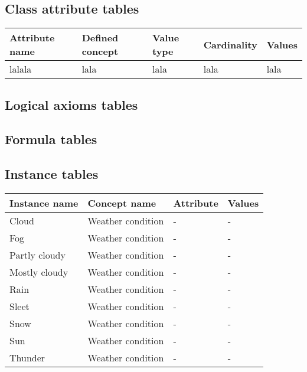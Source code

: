\subsection{Class attribute tables}

\begin{longtable}{|p{}|p{}|p{}|p{}|p{}|}
  \hline
  \textbf{Attribute name} & \textbf{Defined concept} & \textbf{Value type} & \textbf{Cardinality} & \textbf{Values} \\
  \hline\hline
  lalala & lala & lala & lala & lala \\
  \hline
\end{longtable}

\subsection{Logical axioms tables}


\subsection{Formula tables}


\subsection{Instance tables}

\begin{longtable}{|p{}|p{}|p{}|p{}|}
  \hline
  \textbf{Instance name} & \textbf{Concept name} & \textbf{Attribute} & \textbf{Values} \\
  \hline\hline
  Cloud & Weather condition & - & - \\
  \hline
  Fog & Weather condition & - & - \\
  \hline
  Partly cloudy & Weather condition & - & - \\
  \hline
  Mostly cloudy & Weather condition & - & - \\
  \hline
  Rain & Weather condition & - & - \\
  \hline
  Sleet & Weather condition & - & - \\
  \hline
  Snow & Weather condition & - & - \\
  \hline
  Sun & Weather condition & - & - \\
  \hline
  Thunder & Weather condition & - & - \\
  \hline
\end{longtable}

